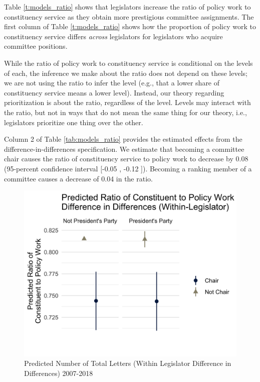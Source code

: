 \documentclass[12pt]{article}
\begin{document}
Table \ref{t:models_ratio} shows that legislators increase the ratio of policy work to constituency service as they obtain more 
prestigious committee assignments. The first column of Table \ref{t:models_ratio} shows how the proportion of policy work to constituency service differs \textit{across} legislators
for legislators who acquire committee positions. 

While the ratio of policy work to constituency service is conditional on the levels of each, the inference we make about the ratio does not depend on these levels; we are not using the ratio to infer the level (e.g., that a lower share of constituency service means a lower level). Instead, our theory regarding prioritization is about the ratio, regardless of the level. Levels may interact with the ratio, but not in ways that do not mean the same thing for our theory, i.e., legislators prioritize one thing over the other. 

Column 2 of Table \ref{tab:models_ratio} provides the estimated effects from the difference-in-differences specification.
We estimate that becoming a committee chair causes the ratio of constituency service to policy work to decrease by 0.08 (95-percent confidence interval [-0.05 , -0.12 ]). Becoming a ranking member of a committee causes a decrease of 0.04 in the ratio.

\begin{figure}[hbt!]
\centering
\caption{Predicted Number of Total Letters (Within Legislator Difference in Differences) 2007-2018} \label{f:m-ratio-predicted}
\includegraphics[width = .8\textwidth]{figs/m-ratio-predicted-3}
\end{figure}
\end{document}
